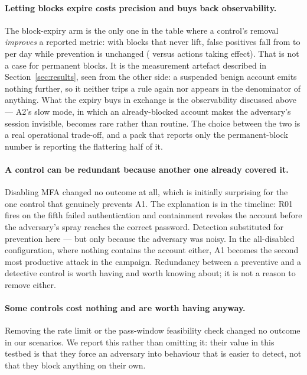\paragraph{Letting blocks expire costs precision and buys back observability.}
The block-expiry arm is the only one in the table where a control's removal
\emph{improves} a reported metric: with blocks that never lift, false positives
fall from \AblFullFP{} to \AblNoExpiryFP{} per day while prevention is unchanged
(\AblFullSucc{} versus \AblNoExpirySucc{} actions taking effect). That is not a
case for permanent blocks. It is the measurement artefact described in
Section~\ref{sec:results}, seen from the other side: a suspended benign account
emits nothing further, so it neither trips a rule again nor appears in the
denominator of anything. What the expiry buys in exchange is the observability
discussed above --- A2's slow mode, in which an already-blocked account makes the
adversary's session invisible, becomes rare rather than routine. The choice
between the two is a real operational trade-off, and a pack that reports only the
permanent-block number is reporting the flattering half of it.

\paragraph{A control can be redundant because another one already covered it.}
Disabling MFA changed no outcome at all, which is initially surprising for the
one control that genuinely prevents A1. The explanation is in the timeline:
R01 fires on the fifth failed authentication and containment revokes the account
before the adversary's spray reaches the correct password. Detection substituted
for prevention here --- but only because the adversary was noisy. In the
all-disabled configuration, where nothing contains the account either, A1 becomes
the second most productive attack in the campaign. Redundancy between a
preventive and a detective control is worth having and worth knowing about; it is
not a reason to remove either.

\paragraph{Some controls cost nothing and are worth having anyway.} Removing the
rate limit or the pass-window feasibility check changed no outcome in our
scenarios. We report this rather than omitting it: their value in this testbed
is that they force an adversary into behaviour that is easier to detect, not that
they block anything on their own.

